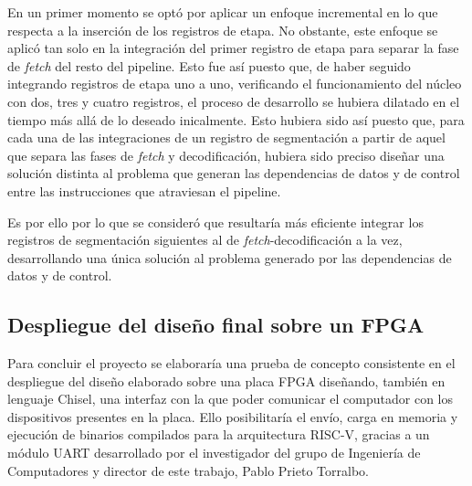En un primer momento se optó por aplicar un enfoque incremental en lo que respecta a la inserción de los registros de etapa. No obstante, este enfoque se aplicó tan solo en la integración del primer registro de etapa para separar la fase de \textit{fetch} del resto del pipeline. Esto fue así puesto que, de haber seguido integrando registros de etapa uno a uno, verificando el funcionamiento del núcleo con dos, tres y cuatro registros, el proceso de desarrollo se hubiera dilatado en el tiempo más allá de lo deseado inicalmente. Esto hubiera sido así puesto que, para cada una de las integraciones de un registro de segmentación a partir de aquel que separa las fases de \textit{fetch} y decodificación, hubiera sido preciso diseñar una solución distinta al problema que generan las dependencias de datos y de control entre las instrucciones que atraviesan el pipeline.

Es por ello por lo que se consideró que resultaría más eficiente integrar los registros de segmentación siguientes al de \textit{fetch}-decodificación a la vez, desarrollando una única solución al problema generado por las dependencias de datos y de control.

\subsection{Despliegue del diseño final sobre un FPGA}

Para concluir el proyecto se elaboraría una prueba de concepto consistente en el despliegue del diseño elaborado sobre una placa FPGA diseñando, también en lenguaje Chisel, una interfaz con la que poder comunicar el computador con los dispositivos presentes en la placa. Ello posibilitaría el envío, carga en memoria y ejecución de binarios compilados para la arquitectura RISC-V, gracias a un módulo UART desarrollado por el investigador del grupo de Ingeniería de Computadores y director de este trabajo, Pablo Prieto Torralbo.